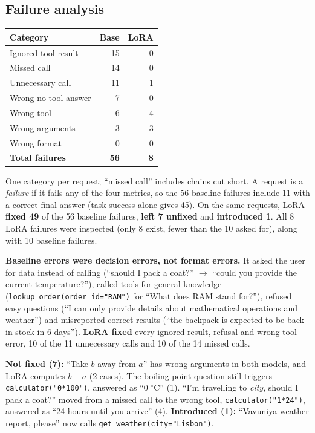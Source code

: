 \documentclass[12pt,a4paper]{article}
\begin{document}
\subsection{Failure analysis}
\noindent
\begin{minipage}[t]{0.37\linewidth}
    \vspace{0pt}
    \begin{tabular}{@{}lrr@{}}
        \toprule
        \textbf{Category} & \textbf{Base} & \textbf{LoRA} \\
        \midrule
        Ignored tool result & 15 & 0 \\
        Missed call & 14 & 0 \\
        Unnecessary call & 11 & 1 \\
        Wrong no-tool answer & 7 & 0 \\
        Wrong tool & 6 & 4 \\
        Wrong arguments & 3 & 3 \\
        Wrong format & 0 & 0 \\
        \midrule
        \textbf{Total failures} & \textbf{56} & \textbf{8} \\
        \bottomrule
    \end{tabular}

    \vspace{3pt}
    One category per request; ``missed call'' includes chains cut short. A request is a \emph{failure} if it fails any of the four metrics, so the 56 baseline failures include 11 with a correct final answer (task success alone gives 45). On the same requests, LoRA \textbf{fixed 49} of the 56 baseline failures, \textbf{left 7 unfixed} and \textbf{introduced 1}. All 8 LoRA failures were inspected (only 8 exist, fewer than the 10 asked for), along with 10 baseline failures.
\end{minipage}\hfill
\begin{minipage}[t]{0.60\linewidth}
    \vspace{0pt}
    \textbf{Baseline errors were decision errors, not format errors.} It asked the user for data instead of calling (``should I pack a coat?'' $\rightarrow$ ``could you provide the current temperature?''), called tools for general knowledge (\verb|lookup_order(order_id="RAM")| for ``What does RAM stand for?''), refused easy questions (``I can only provide details about mathematical operations and weather'') and misreported correct results (``the backpack is expected to be back in stock in 6 days''). \textbf{LoRA fixed} every ignored result, refusal and wrong-tool error, 10 of the 11 unnecessary calls and 10 of the 14 missed calls.

    \textbf{Not fixed (7):} ``Take $b$ away from $a$'' has wrong arguments in both models, and LoRA computes $b-a$ (2 cases). The boiling-point question still triggers \verb|calculator("0*100")|, answered as ``0 $^\circ$C'' (1). ``I'm travelling to \textit{city}, should I pack a coat?'' moved from a missed call to the wrong tool, \verb|calculator("1*24")|, answered as ``24 hours until you arrive'' (4). \textbf{Introduced (1):} ``Vavuniya weather report, please'' now calls \verb|get_weather(city="Lisbon")|.
\end{minipage}
\end{document}
